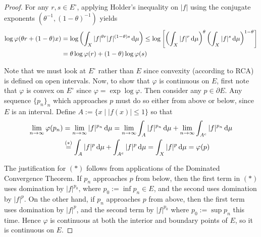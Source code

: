 \begin{proof}
     For any \(r, s \in E^\circ\), applying Holder's inequality on \(|f|\) using the conjugate exponents \((\theta^{-1}, (1 - \theta)^{-1})\) yields
    \begin{align*}
        \log \varphi(\theta r + (1 - \theta) x) 
        &= \log \left( \int_X |f|^{\theta r} |f|^{(1 - \theta) s} \, \mathrm{d}\mu \right)
        \leq \log \left[ \left( \int_X |f|^r \, \mathrm{d}\mu \right)^\theta \left( \int_X |f|^s \, \mathrm{d}\mu \right)^{1 - \theta} \right] \\
        &= \theta \log \varphi(r) + (1 - \theta) \log \varphi(s)
    \end{align*}

    Note that we must look at \(E^\circ\) rather than \(E\) since convexity (according to RCA) is defined on open intervals. Now, to show that \(\varphi\) is continuous on \(E\), first note that \(\varphi\) is convex on \(E^\circ\) since \(\varphi = \exp \log \varphi\). Then consider any \(p \in \partial E\). Any sequence \(\{p_n\}_n\) which approaches \(p\) must do so either from above or below, since \(E\) is an interval. Define \(A := \{ x \mid |f(x)| \leq 1 \}\) so that 
    \begin{align*}
        \lim_{n \to \infty} \varphi(p_n) 
        &= \lim_{n \to \infty} |f|^{p_n} \, \mathrm{d}\mu 
        = \lim_{n \to \infty} \int_A |f|^{p_n} \, \mathrm{d}\mu + \lim_{n \to \infty} \int_{A^c} |f|^{p_n} \, \mathrm{d}\mu \\
        &\stackrel{(*)}{=} \int_A |f|^p \, \mathrm{d}\mu + \int_{A^c} |f|^p \, \mathrm{d}\mu
        = \int_X |f|^p \, \mathrm{d}\mu
        = \varphi(p)
    \end{align*}

    The justification for \((*)\) follows from applications of the Dominated Convergence Theorem. If \(p_n\) approaches \(p\) from below, then the first term in \((*)\) uses domination by \(|f|^{p_0}\), where \(p_0 := \inf p_n \in E\), and the second uses domination by \(|f|^p\). On the other hand, if \(p_n\) approaches \(p\) from above, then the first term uses domination by \(|f|^p\), and the second term by \(|f|^{p_0}\) where \(p_0 := \sup p_n\) this time. Hence \(\varphi\) is continuous at both the interior and boundary points of \(E\), so it is continuous on \(E\). 
\end{proof}

